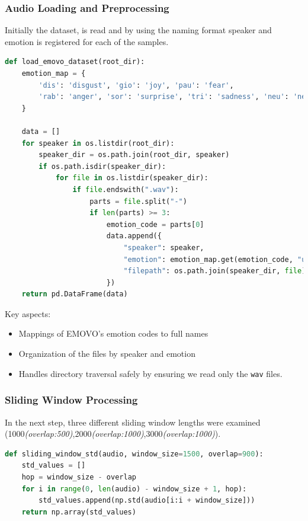 \documentclass{article}
\begin{document}
\subsubsection{Audio Loading and Preprocessing}
Initially the dataset, is read and by using the naming format speaker and emotion is
registered for each of the samples.
\begin{lstlisting}[language=Python]
def load_emovo_dataset(root_dir):
    emotion_map = {
        'dis': 'disgust', 'gio': 'joy', 'pau': 'fear',
        'rab': 'anger', 'sor': 'surprise', 'tri': 'sadness', 'neu': 'neutral'
    }
    
    data = []
    for speaker in os.listdir(root_dir):
        speaker_dir = os.path.join(root_dir, speaker)
        if os.path.isdir(speaker_dir):
            for file in os.listdir(speaker_dir):
                if file.endswith(".wav"):
                    parts = file.split("-")
                    if len(parts) >= 3:
                        emotion_code = parts[0]
                        data.append({
                            "speaker": speaker,
                            "emotion": emotion_map.get(emotion_code, "unknown"),
                            "filepath": os.path.join(speaker_dir, file)
                        })
    return pd.DataFrame(data)
\end{lstlisting}

Key aspects:
\begin{itemize}
    \item Mappings of EMOVO's emotion codes to full names
    \item Organization of the files by speaker and emotion
    \item Handles directory traversal safely by ensuring we read only the \texttt{wav} files.
\end{itemize}

\subsubsection{Sliding Window Processing}

In the next step, three different sliding window lengths were examined (1000\textit{(overlap:500)},2000\textit{(overlap:1000)},3000\textit{(overlap:1000)}).

\begin{lstlisting}[language=Python]
def sliding_window_std(audio, window_size=1500, overlap=900):
    std_values = []
    hop = window_size - overlap
    for i in range(0, len(audio) - window_size + 1, hop):
        std_values.append(np.std(audio[i:i + window_size]))
    return np.array(std_values)
\end{lstlisting}
\end{document}
